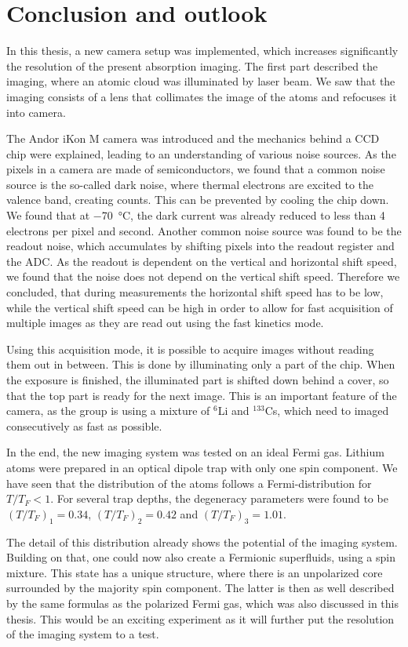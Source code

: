 \chapter{Conclusion and outlook}

In this thesis, a new camera setup was implemented, which increases significantly the resolution of the present absorption imaging. The first part described the imaging, where an atomic cloud was illuminated by laser beam. We saw that the imaging consists of a lens that collimates the image of the atoms and refocuses it into camera.

The Andor iKon M camera was introduced and the mechanics behind a CCD chip were explained, leading to an understanding of various noise sources. As the pixels in a camera are made of semiconductors, we found that a common noise source is the so-called dark noise, where thermal electrons are excited to the valence band, creating counts. This can be prevented by cooling the chip down. We found that at \SI{-70}{\degreeCelsius}, the dark current was already reduced to less than 4 electrons per pixel and second. Another common noise source was found to be the readout noise, which accumulates by shifting pixels into the readout register and the ADC.
As the readout is dependent on the vertical and horizontal shift speed, we found that the noise does not depend on the vertical shift speed. Therefore we concluded, that during measurements the horizontal shift speed has to be low, while the vertical shift speed can be high in order to allow for fast acquisition of multiple images as they are read out using the fast kinetics mode.

Using this acquisition mode, it is possible to acquire images without reading them out in between. This is done by illuminating only a part of the chip. When the exposure is finished, the illuminated part is shifted down behind a cover, so that the top part is ready for the next image. This is an important feature of the camera, as the group is using a mixture of $^6$Li and $^{133}$Cs, which need to imaged consecutively as fast as possible.

In the end, the new imaging system was tested on an ideal Fermi gas. Lithium atoms were prepared in an optical dipole trap with only one spin component. We have seen that the distribution of the atoms follows a Fermi-distribution for $T/T_F < 1$. For several trap depths, the degeneracy parameters were found to be $(T/T_F)_1 = 0.34$, $(T/T_F)_2 = 0.42$ and $(T/T_F)_3 = 1.01$.

The detail of this distribution already shows the potential of the imaging system. Building on that, one could now also create a Fermionic superfluids, using a spin mixture. This state has a unique structure, where there is an unpolarized core surrounded by the majority spin component\cite{Shin2006,Zwierlein2006b}. The latter is then as well described by the same formulas as the polarized Fermi gas, which was also discussed in this thesis. This would be an exciting experiment as it will further put the resolution of the imaging system to a test.

